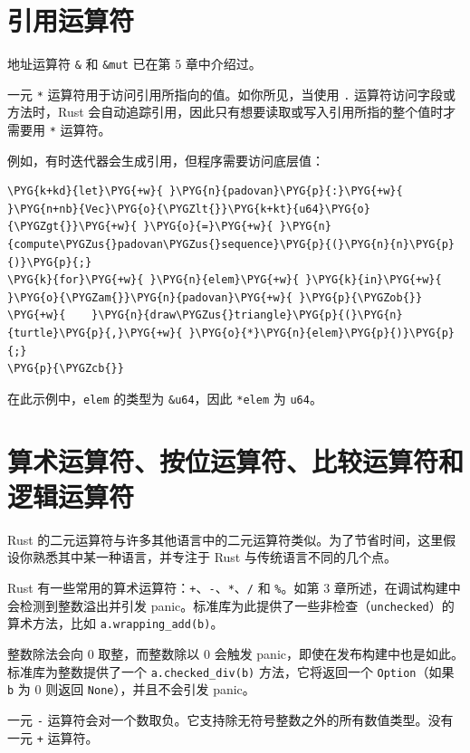 \section{引用运算符}

地址运算符 \texttt{\&} 和 \texttt{\&mut} 已在第 5 章中介绍过。

一元 \texttt{*} 运算符用于访问引用所指向的值。如你所见，当使用 \texttt{.} 运算符访问字段或方法时，Rust 会自动追踪引用，因此只有想要读取或写入引用所指的整个值时才需要用 \texttt{*} 运算符。

例如，有时迭代器会生成引用，但程序需要访问底层值：

\begin{Verbatim}[commandchars=\\\{\},breaklines=true,breakanywhere=true,fontsize=\codefont,xleftmargin=17bp]
\PYG{k+kd}{let}\PYG{+w}{ }\PYG{n}{padovan}\PYG{p}{:}\PYG{+w}{ }\PYG{n+nb}{Vec}\PYG{o}{\PYGZlt{}}\PYG{k+kt}{u64}\PYG{o}{\PYGZgt{}}\PYG{+w}{ }\PYG{o}{=}\PYG{+w}{ }\PYG{n}{compute\PYGZus{}padovan\PYGZus{}sequence}\PYG{p}{(}\PYG{n}{n}\PYG{p}{)}\PYG{p}{;}
\PYG{k}{for}\PYG{+w}{ }\PYG{n}{elem}\PYG{+w}{ }\PYG{k}{in}\PYG{+w}{ }\PYG{o}{\PYGZam{}}\PYG{n}{padovan}\PYG{+w}{ }\PYG{p}{\PYGZob{}}
\PYG{+w}{    }\PYG{n}{draw\PYGZus{}triangle}\PYG{p}{(}\PYG{n}{turtle}\PYG{p}{,}\PYG{+w}{ }\PYG{o}{*}\PYG{n}{elem}\PYG{p}{)}\PYG{p}{;}
\PYG{p}{\PYGZcb{}}
\end{Verbatim}

在此示例中，\texttt{elem} 的类型为 \texttt{\&u64}，因此 \texttt{*elem} 为 \texttt{u64}。

\section{算术运算符、按位运算符、比较运算符和逻辑运算符}

Rust 的二元运算符与许多其他语言中的二元运算符类似。为了节省时间，这里假设你熟悉其中某一种语言，并专注于 Rust 与传统语言不同的几个点。

Rust 有一些常用的算术运算符：\texttt{+}、\texttt{-}、\texttt{*}、\texttt{/} 和 \texttt{\%}。如第 3 章所述，在调试构建中会检测到整数溢出并引发 panic。标准库为此提供了一些非检查（\texttt{unchecked}）的算术方法，比如 \texttt{a.wrapping\_add(b)}。

整数除法会向 0 取整，而整数除以 0 会触发 panic，即使在发布构建中也是如此。标准库为整数提供了一个 \texttt{a.checked\_div(b)} 方法，它将返回一个 \texttt{Option}（如果 \texttt{b} 为 0 则返回 \texttt{None}），并且不会引发 panic。

一元 \texttt{-} 运算符会对一个数取负。它支持除无符号整数之外的所有数值类型。没有一元 \texttt{+} 运算符。

